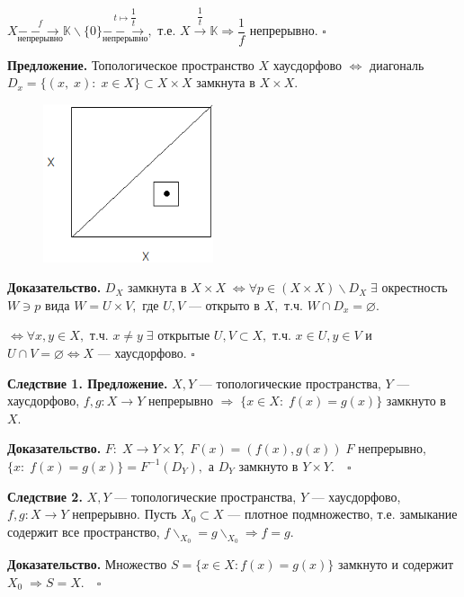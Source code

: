 \documentclass[12pt,a4paper]{article}
\begin{document}
$X \underset{\text{непрерывно}}{\overset{f}{-\!-\!\to}} \mathbb{K} \backslash \{0\} \underset{\text{непрерывно}}{\overset{t \mapsto \dfrac{1}{t}}{-\!-\!\to}},$ т.е. $X \overset{\dfrac{1}{t}}{\to} \mathbb{K} \Rightarrow \dfrac{1}{f}$ непрерывно. $\square$ 

\textbf{Предложение.} Топологическое пространство $X$ хаусдорфово $\Leftrightarrow$ диагональ $D_{x} = \{(x, \; x): \; x \in X\} \subset X \times X$ замкнута в $X \times X.$ 

\begin{figure}
	\includegraphics[width = 5cm]{lect7_2.png}
\end{figure}

\textbf{Доказательство.} $D_{X}$ замкнута в $X \times X \; \Leftrightarrow \forall p \in (X \times X) \backslash D_{X} \; \exists$ окрестность $W \ni p$ вида $W = U \times V,$ где $U, V$ --- открыто в $X,$ т.ч. $W \cap D_{x} = \varnothing.$ 

$\Leftrightarrow \forall x, y \in X,$ т.ч. $x \neq y \; \exists$ открытые $U, V \subset X,$ т.ч. $x \in U, y \in V$ и $U \cap V = \varnothing \Leftrightarrow X$ --- хаусдорфово. $\square$ 

\textbf{Следствие 1. Предложение.} $X, Y$ --- топологические пространства, $Y$ --- хаусдорфово, $f, g: X \to Y$ непрерывно $\Rightarrow \; \{x \in X: \; f(x) = g(x)\}$ замкнуто в $X.$

\textbf{Доказательство.} $F: \; X \to Y \times Y, \; F(x) = (f(x), g(x))  \; F$ непрерывно, $\{x: \; f(x) = g(x)\} = F^{-1}(D_{Y}),$ а $D_{Y}$ замкнуто в $Y \times Y. \quad \square$

\textbf{Следствие 2.} $X, Y$ --- топологические пространства, $Y$ --- хаусдорфово, $f, g: X \to Y$ непрерывно. Пусть $X_{0} \subset X$ --- плотное подмножество, т.е. замыкание содержит все пространство, $f \backslash_{X_{0}} = g \backslash_{X_{0}} \Rightarrow f = g.$ 

\textbf{Доказательство.} Множество $S = \{x \in X: f(x) = g(x)\}$ замкнуто и содержит $X_{0} \; \Rightarrow S = X. \quad \square$
\end{document}

